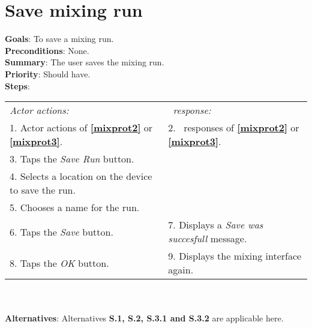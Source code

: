      \section{Save mixing run}
  \label{saverun}
  \textbf{Goals}: To save a mixing run.\\
  \textbf{Preconditions}: None. \\
  \textbf{Summary}: The user saves the mixing run.\\
  \textbf{Priority}: Should have.\\
  \textbf{Steps}: \\
  \begin{tabular}{ p{} p{} }
  	\emph{Actor actions:} & \emph{\projectname\ response:} \\
  	1. Actor actions of \textbf{\ref{mixprot2}} or \textbf{\ref{mixprot3}}. & 2. \projectname\ responses of \textbf{\ref{mixprot2}} or \textbf{\ref{mixprot3}}. \\
    3. Taps the \emph{Save Run} button.  & \\
    4. Selects a location on the device to save the run. & \\
    5. Chooses a name for the run. & \\
    6. Taps the \emph{Save} button. & 7. Displays a \emph{Save was succesfull} message.\\
    8. Taps the \emph{OK} button. & 9. Displays the mixing interface again. \\
      \end{tabular}
    	 \\
    \\\textbf{Alternatives}: Alternatives \textbf{S.1, S.2, S.3.1 and S.3.2} are applicable here.
    


  
  

